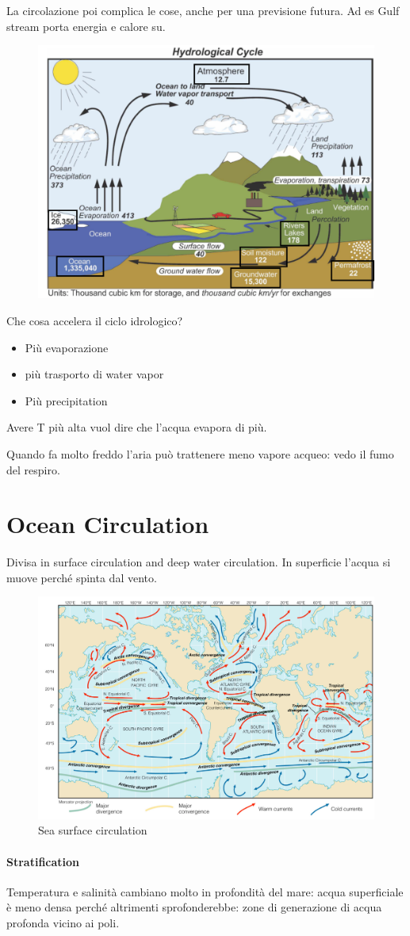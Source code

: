 La circolazione poi complica le cose, anche per una previsione futura. Ad es Gulf stream porta energia e calore su.
\begin{figure}[htpb]
    \centering
    \includegraphics[width=0.5\linewidth]{uploads/hydro cycle.png}
\end{figure}
Che cosa accelera il ciclo idrologico?
\begin{itemize}
    \item Più evaporazione
    \item più trasporto di water vapor
    \item Più precipitation
\end{itemize}
Avere T più alta vuol dire che l'acqua evapora di più.

Quando fa molto freddo l'aria può trattenere meno vapore acqueo: vedo il fumo del respiro.
\section{Ocean Circulation}
Divisa in surface circulation and deep water circulation. In superficie l'acqua si muove perché spinta dal vento.
\begin{figure}[htpb]
    \centering
    \includegraphics[width=0.5\linewidth]{uploads/Sea surface circulation.png}
    \caption{Sea surface circulation}
\end{figure}
\paragraph{Stratification}
Temperatura e salinità cambiano molto in profondità del mare: acqua superficiale è meno densa perché altrimenti sprofonderebbe: zone di generazione di acqua profonda vicino ai poli. 


